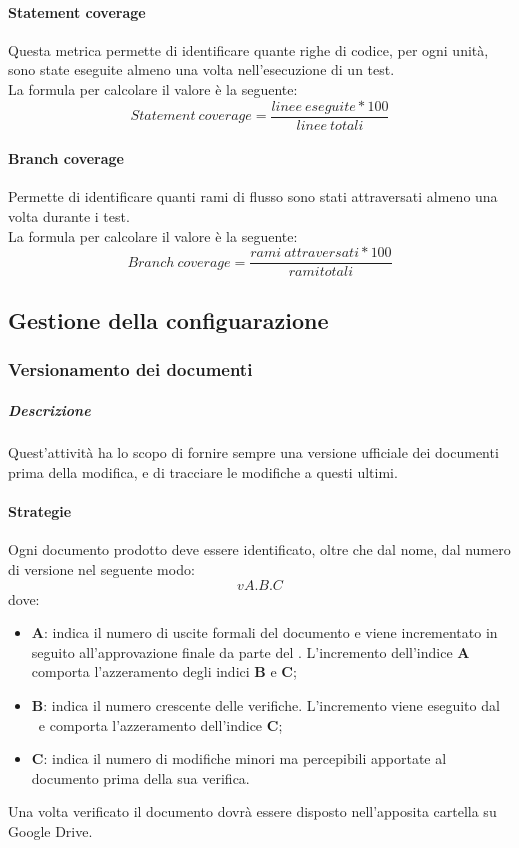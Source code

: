 \documentclass[../NormeDiProgetto_v3.0.0.tex]{subfiles}
\begin{document}
				\paragraph{Statement coverage}
				Questa metrica permette di identificare quante righe di codice, per ogni unità, sono state eseguite almeno una volta nell'esecuzione di un test.\\La formula per calcolare il valore è la seguente:
				\begin{equation*}
					Statement \ coverage = \frac{linee \ eseguite * 100}{linee \ totali}
				\end{equation*}
				
				\paragraph{Branch coverage}
				Permette di identificare quanti rami di flusso sono stati attraversati almeno una volta durante i test.\\La formula per calcolare il valore è la seguente:
				\begin{equation*}
					Branch \ coverage = \frac{rami \ attraversati* 100}{rami totali}
				\end{equation*}

		\subsection{Gestione della configuarazione}
			\subsubsection{Versionamento dei documenti}
				\subparagraph{Descrizione}
					Quest'attività ha lo scopo di fornire sempre una versione ufficiale dei documenti prima della modifica, e di tracciare le modifiche a questi ultimi.
				
				\paragraph{Strategie}
				Ogni documento prodotto deve essere identificato, oltre che dal nome, dal numero
				di versione nel seguente modo:
				\begin{equation*}
					vA.B.C
				\end{equation*}
				dove:
				\begin{itemize}
				\item \textbf{A}: indica il numero di uscite formali del documento e viene
				incrementato in seguito all'approvazione finale da parte del \responsabilediprogetto.
				L'incremento dell'indice \textbf{A} comporta l'azzeramento degli indici
				\textbf{B} e \textbf{C};
				\item \textbf{B}: indica il numero crescente delle verifiche. L'incremento viene eseguito dal \verificatore\ e comporta l'azzeramento dell'indice \textbf{C};
				\item \textbf{C}: indica il numero di modifiche minori ma percepibili apportate al documento prima della sua verifica.
				\end{itemize}
				Una volta verificato il documento dovrà essere disposto nell'apposita cartella su Google Drive.
\end{document}
